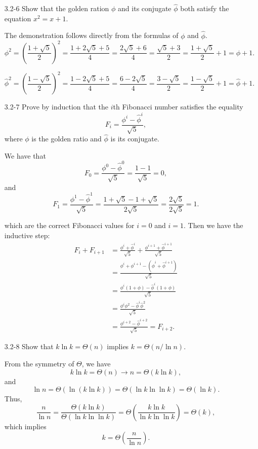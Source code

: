 \begin{enumerate}
\item[3.2{-}6]{Show that the golden ration $\phi$ and its conjugate $\hat\phi$}
both satisfy the equation $x^2 = x + 1$.

\begin{framed}
The demonstration follows directly from the formulas of $\phi$ and $\hat\phi$.
\[
\phi^2 = \left(\frac{1 + \sqrt{5}}{2}\right)^2 = \frac{1 + 2 \sqrt{5} + 5}{4}
       = \frac{2 \sqrt{5} + 6}{4} = \frac{\sqrt{5} + 3}{2}
       = \frac{1 + \sqrt{5}}{2} + 1 = \phi + 1.
\]

\[
\hat\phi^2 = \left(\frac{1 - \sqrt{5}}{2}\right)^2 = \frac{1 - 2 \sqrt{5} + 5}{4}
           = \frac{6 - 2 \sqrt{5}}{4} = \frac{3 - \sqrt{5}}{2}
           = \frac{1 - \sqrt{5}}{2} + 1 = \hat\phi + 1.
\]
\end{framed}

\item[3.2{-}7]{Prove by induction that the $i$th Fibonacci number satisfies the
equality
\[
F_i = \frac{\phi^i - \hat\phi^i}{\sqrt{5}},
\]
where $\phi$ is the golden ratio and $\hat\phi$ is its conjugate.
}

\begin{framed}
We have that
\[
F_0 = \frac{\phi^0 - \hat\phi^0}{\sqrt{5}} = \frac{1 - 1}{\sqrt{5}} = 0,
\]
and
\[
F_1 = \frac{\phi^1 - \hat\phi^1}{\sqrt{5}}
    = \frac{1 + \sqrt{5} - 1 + \sqrt{5}}{2 \sqrt{5}}
    = \frac{2 \sqrt{5}}{2 \sqrt{5}} = 1.
\]

which are the correct Fibonacci values for $i = 0$ and $i = 1$. Then we have the inductive step:
\begin{equation*}
\begin{split}
F_i + F_{i + 1} &= \frac{\phi^i + \hat\phi^i}{\sqrt{5}} +
                   \frac{\phi^{i + 1} + \hat\phi^{i + 1}}{\sqrt{5}}\\
                &= \frac{\phi^i + \phi^{i + 1} - (\hat\phi^i + \hat\phi^{i + 1})}{\sqrt{5}}\\
                &= \frac{\phi^i (1 + \phi) - \hat\phi^i (1 + \phi)}{\sqrt{5}}\\
                &= \frac{\phi^i \phi^2 - \hat\phi^i \hat\phi^2}{\sqrt{5}}\\
                &= \frac{\phi^{i + 2} - \hat\phi^{i + 2}}{\sqrt{5}} = F_{i + 2}.
\end{split}
\end{equation*}
\end{framed}

\item[3.2{-}8]{Show that $k \ln k = \Theta(n)$ implies $k = \Theta(n / \ln n)$.}

\begin{framed}
From the symmetry of $\Theta$, we have
\[
k \ln k = \Theta(n) \rightarrow n = \Theta(k \ln k),
\]
and
\[
\ln n = \Theta(\ln(k \ln k)) = \Theta(\ln k \ln \ln k) = \Theta(\ln k).
\]
Thus,
\[
\frac{n}{\ln n} = \frac{\Theta(k \ln k)}{\Theta(\ln k \ln \ln k)}
                = \Theta\left(\frac{k \ln k}{\ln k \ln \ln k}\right)
                = \Theta(k),
\]
which implies
\[
k = \Theta\left(\frac{n}{\ln n}\right).
\]
\end{framed}

\end{enumerate}

